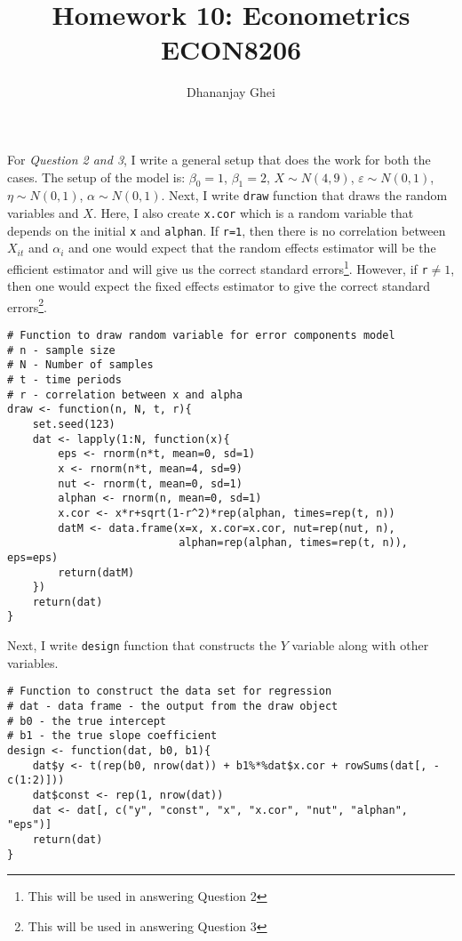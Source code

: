 \documentclass{article}
\title{Homework 10: Econometrics\\
  ECON8206}
\author{Dhananjay Ghei}
\begin{document}
\maketitle
For \textit{Question 2 and 3}, I write a general setup that does the
work for both the cases. The setup of the model is:
$\beta_0=1$, $\beta_1=2$, $X \sim N(4, 9)$, $\varepsilon \sim N(0, 1)$,
$\eta \sim N(0, 1)$, $\alpha \sim N(0, 1)$. Next, I write
\texttt{draw} function that draws the random variables and $X$. Here,
I also create \texttt{x.cor} which is a random variable that depends
on the initial \texttt{x} and \texttt{alphan}. If \texttt{r=1}, then
there is no correlation between $X_{it}$ and $\alpha_i$ and one would
expect that the random effects estimator will be the efficient
estimator and will give us the correct standard errors\footnote{This
  will be used in answering Question 2}. However, if
\texttt{r}$\neq 1$, then one would expect the fixed effects estimator
to give the correct standard errors\footnote{This will be used in
  answering Question 3}. 
\begin{verbatim}
# Function to draw random variable for error components model
# n - sample size
# N - Number of samples
# t - time periods 
# r - correlation between x and alpha
draw <- function(n, N, t, r){
    set.seed(123)
    dat <- lapply(1:N, function(x){
        eps <- rnorm(n*t, mean=0, sd=1)
        x <- rnorm(n*t, mean=4, sd=9)
        nut <- rnorm(t, mean=0, sd=1)
        alphan <- rnorm(n, mean=0, sd=1)
        x.cor <- x*r+sqrt(1-r^2)*rep(alphan, times=rep(t, n))
        datM <- data.frame(x=x, x.cor=x.cor, nut=rep(nut, n),
                           alphan=rep(alphan, times=rep(t, n)), eps=eps)
        return(datM)
    })
    return(dat)
}
\end{verbatim}
Next, I write \texttt{design} function that constructs the $Y$
variable along with other variables.
\begin{verbatim}
# Function to construct the data set for regression
# dat - data frame - the output from the draw object
# b0 - the true intercept 
# b1 - the true slope coefficient
design <- function(dat, b0, b1){
    dat$y <- t(rep(b0, nrow(dat)) + b1%*%dat$x.cor + rowSums(dat[, -c(1:2)]))
    dat$const <- rep(1, nrow(dat))
    dat <- dat[, c("y", "const", "x", "x.cor", "nut", "alphan", "eps")]
    return(dat)
}
\end{verbatim}
\end{document}
